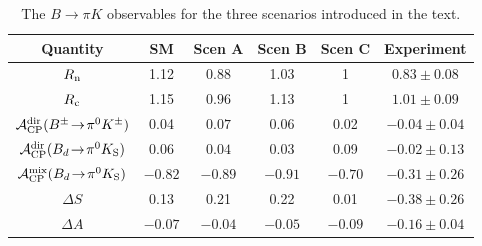 \documentclass[11pt]{cernrep}
\begin{document}
\begin{table}%
\vspace{0.4cm}
\begin{center}
\begin{tabular}{|c||c|c|c|c|c|}
\hline
  Quantity & SM & Scen A & Scen B &  Scen C & Experiment
 \\ \hline 
$R_{\rm n}$  & 1.12 &$0.88$ & 1.03 &  1 & $0.83 \pm 0.08$ \\\hline
$R_{\rm c}$  & 1.15 &$0.96$ & 1.13 & 1  & $1.01 \pm 0.09$ \\\hline
${\cal A}_{\rm CP}^{\rm dir}(B^\pm\!\to\!\pi^0 K^\pm) $ &
  0.04 & $0.07$  \rule{0em}{1.05em}& 0.06 & 0.02  &  $-0.04 \pm 0.04$ \\ \hline
${\cal A}_{\rm CP}^{\rm dir}(B_d\!\to\!\pi^0 K_{\rm S})$ & 
  0.06 & $0.04$  \rule{0em}{1.05em}& 0.03  & 0.09 & $-0.02 \pm 0.13$ \\ \hline 
${\cal A}_{\rm CP}^{\rm mix}(B_d\!\to\!\pi^0 K_{\rm S})$ & 
  $-0.82$ & $-0.89$\rule{0em}{1.05em}& $-0.91$ & $-0.70$ &  $-0.31 \pm 0.26$ \\ \hline
$\Delta S$ & 0.13& 0.21& 0.22& 0.01& $-0.38\pm0.26$ \\ \hline
$\Delta A$ & $-0.07$& $-0.04$& $-0.05$& $-0.09$& $-0.16\pm0.04$ \\ \hline
\end{tabular}
\caption{\label{Scentab1} The $B\to\pi K$ observables for the 
 three scenarios introduced in the text. }
\end{center}
\end{table}
\end{document}
